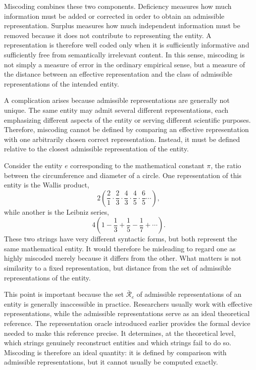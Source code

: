 Miscoding combines these two components. Deficiency measures how much information must be added or corrected in order to obtain an admissible representation. Surplus measures how much independent information must be removed because it does not contribute to representing the entity. A representation is therefore well coded only when it is sufficiently informative and sufficiently free from semantically irrelevant content. In this sense, miscoding is not simply a measure of error in the ordinary empirical sense, but a measure of the distance between an effective representation and the class of admissible representations of the intended entity.

A complication arises because admissible representations are generally not unique. The same entity may admit several different representations, each emphasizing different aspects of the entity or serving different scientific purposes. Therefore, miscoding cannot be defined by comparing an effective representation with one arbitrarily chosen correct representation. Instead, it must be defined relative to the closest admissible representation of the entity.

\begin{example}
\label{ex:leibniz-wallis}
Consider the entity $e$ corresponding to the mathematical constant $\pi$, the ratio between the circumference and diameter of a circle. One representation of this entity is the Wallis product,
\[
2\left(\frac{2}{1}\cdot\frac{2}{3}\cdot\frac{4}{3}\cdot\frac{4}{5}\cdot\frac{6}{5}\cdots\right),
\]
while another is the Leibniz series,
\[
4\left(1-\frac{1}{3}+\frac{1}{5}-\frac{1}{7}+\cdots\right).
\]
These two strings have very different syntactic forms, but both represent the same mathematical entity. It would therefore be misleading to regard one as highly miscoded merely because it differs from the other. What matters is not similarity to a fixed representation, but distance from the set of admissible representations of the entity.
\end{example}

This point is important because the set $\bar{\mathcal{R}}_e$ of admissible representations of an entity is generally inaccessible in practice. Researchers usually work with effective representations, while the admissible representations serve as an ideal theoretical reference. The representation oracle introduced earlier provides the formal device needed to make this reference precise. It determines, at the theoretical level, which strings genuinely reconstruct entities and which strings fail to do so. Miscoding is therefore an ideal quantity: it is defined by comparison with admissible representations, but it cannot usually be computed exactly.

